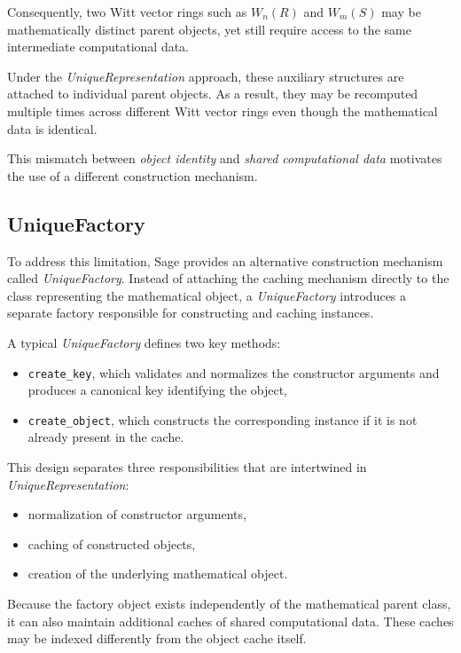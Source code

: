 \documentclass[oneside, a4paper, onecolumn, 11pt]{article}
\theoremstyle{definition}
\begin{document}
Consequently, two Witt vector rings such as $W_n(R)$ and $W_m(S)$ may be mathematically distinct parent objects, yet still require access to the same intermediate computational data.

Under the \emph{UniqueRepresentation} approach, these auxiliary structures are attached to individual parent objects. As a result, they may be recomputed multiple times across different Witt vector rings even though the mathematical data is identical.

This mismatch between \emph{object identity} and \emph{shared computational data} motivates the use of a different construction mechanism.


\subsection{UniqueFactory}

To address this limitation, Sage provides an alternative construction mechanism called \emph{UniqueFactory}. Instead of attaching the caching mechanism directly to the class representing the mathematical object, a \emph{UniqueFactory} introduces a separate factory responsible for constructing and caching instances.

A typical \emph{UniqueFactory} defines two key methods:

\begin{itemize}
\item \texttt{create\_key}, which validates and normalizes the constructor arguments and produces a canonical key identifying the object,
\item \texttt{create\_object}, which constructs the corresponding instance if it is not already present in the cache.
\end{itemize}

This design separates three responsibilities that are intertwined in \emph{UniqueRepresentation}:

\begin{itemize}
\item normalization of constructor arguments,
\item caching of constructed objects,
\item creation of the underlying mathematical object.
\end{itemize}

Because the factory object exists independently of the mathematical parent class, it can also maintain additional caches of shared computational data. These caches may be indexed differently from the object cache itself.
\end{document}
